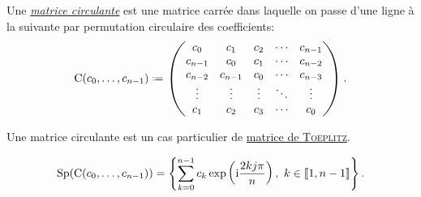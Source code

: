 \begin{tcolorbox}
Une \href{https://fr.wikipedia.org/wiki/Matrice_circulante}{\emph{matrice circulante}} est une matrice carrée dans laquelle on passe d'une ligne à la suivante par permutation circulaire des coefficients:
$$
\mathrm{C}(c_0, \dots, c_{n-1}) \defeq
\begin{pmatrix}
c_0 & c_1 & c_2 & \cdots & c_{n-1} \\
c_{n-1} & c_0 & c_1 & \cdots & c_{n-2} \\
c_{n-2} & c_{n-1} & c_0 & \cdots & c_{n-3} \\
\vdots & \vdots & \vdots & \ddots & \vdots \\
c_1 & c_2 & c_3 & \cdots & c_0
\end{pmatrix}.
$$
\end{tcolorbox}

\begin{remarque}
    Une matrice circulante est un cas particulier de \href{https://fr.wikipedia.org/wiki/Matrice_de_Toeplitz}{matrice de \textsc{Toeplitz}}.
\end{remarque}

\begin{prop}
    $$\mathrm{Sp}(\mathrm{C}(c_0, \dots, c_{n-1})) = \left \{ \sum_{k=0}^{n-1} c_k \exp \left( \mathrm{i} \frac{2kj \pi}{n} \right),\ k \in \llbracket 1, n-1 \rrbracket \right \}.$$
\end{prop}

